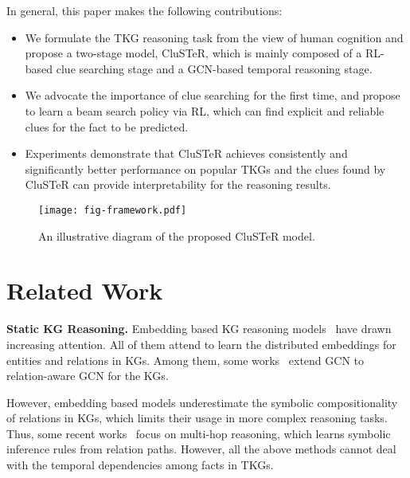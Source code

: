 \documentclass[11pt,a4paper]{article}
\begin{document}
In general, this paper makes the following contributions:
 \begin{itemize}

\item We formulate the TKG reasoning task from the view of human cognition and
propose a two-stage model, CluSTeR, which is mainly composed of a RL-based clue
searching stage and a GCN-based temporal reasoning stage. 

\item We advocate the importance of clue searching for the first time,
and propose to learn a beam search policy via RL, which
can find explicit and reliable clues for the fact to be predicted.

\item Experiments demonstrate that CluSTeR achieves consistently
and significantly better performance on popular TKGs and the clues found by
CluSTeR can provide interpretability for the reasoning results.
\end{itemize}


\begin{figure*}[tbp]  
  \centering
  \texttt{[image: fig-framework.pdf]}
  \caption{An illustrative diagram of the proposed CluSTeR model.}
  \label{fig:framework}
  \end{figure*}


\section{Related Work}
 
{\bf Static KG Reasoning.} Embedding based KG reasoning
models~\cite{bordes2013translating, yang2014embedding, trouillon2016complex,
dettmers2018convolutional, shang2019end, sun2018rotate} have drawn increasing
attention. All of them attend to learn the distributed embeddings for entities
and relations in KGs. Among them, some
works~\cite{schlichtkrull2018modeling,shang2019end,ye2019vectorized,vashishth2019composition}
extend GCN to relation-aware GCN for the KGs. 

However, embedding based models underestimate the symbolic compositionality of
relations in KGs, which limits their usage in more complex reasoning tasks.
Thus, some recent works~\cite{xiong2017deeppath,das2018go, lin2018multi,
chen2018variational, wang2019incorporating, li2019divine} focus on multi-hop
reasoning, which learns symbolic inference rules from relation paths. However,
all the above methods cannot deal with the temporal dependencies among facts in
TKGs.
\end{document}
